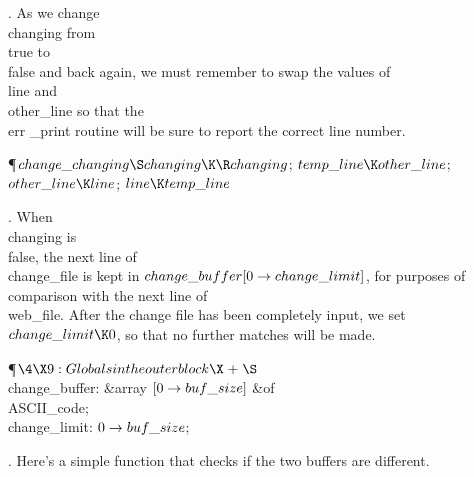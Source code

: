. As we change \\{changing} from \\{true} to \\{false} and back again, we
must
remember to swap the values of \\{line} and \\{other\_line} so that the \\{err%
\_print}
routine will be sure to report the correct line number.

\Y\P\D {}$\\{change\_changing}\S\\{changing}\K\R\\{changing}$;\5
$\\{temp\_line}\K\\{other\_line}$;\5
$\\{other\_line}\K\\{line}$;\5
$\\{line}\K\\{temp\_line}$\par
\fi

. When \\{changing} is \\{false}, the next line of \\{change\_file} is kept
in
$\\{change\_buffer}[0\to\\{change\_limit}]$, for purposes of comparison with
the next
line of \\{web\_file}. After the change file has been completely input, we
set $\\{change\_limit}\K0$, so that no further matches will be made.

\Y\P$\4\X9:Globals in the outer block\X\mathrel{+}\S$\6
\4\\{change\_buffer}: \&{array} $[0\to\\{buf\_size}]$ \1\&{of}\5
\\{ASCII\_code};\2\6
\4\\{change\_limit}: $0\to\\{buf\_size}$;\par
\fi

. Here's a simple function that checks if the two buffers are different.

